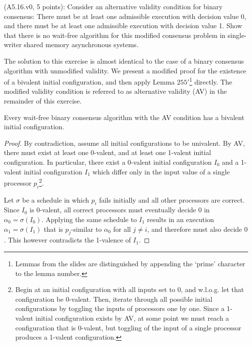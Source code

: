 \begin{Exc}{(A5.16.v0, 5 points):}
Consider an alternative validity condition for binary consensus: There must
be at least one admissible execution with decision value 0, and there
must be at least one admissible execution with decision value 1.
Show that there is no wait-free algorithm for this modified consensus
problem in single-writer shared memory asynchronous systems.
\end{Exc}

The solution to this exercise is almost identical to the case of a binary consensus algorithm
with unmodified validity. We present a modified proof for the existence of a bivalent initial
configuration, and then apply Lemma $255'$\footnote{Lemmas from the slides are
distinguished by appending the `prime' character to the lemma number.} directly. The modified
validity condition is referred to as alternative validity (AV) in the remainder of this exercise.

\begin{lemma}
Every wait-free binary consensus algorithm with the AV condition has a bivalent initial
configuration.
\end{lemma}

\begin{proof}
By contradiction, assume all initial configurations to be univalent. By AV, there must exist
at least one 0-valent, and at least one 1-valent initial configuration. In particular, there exist
a 0-valent initial configuration $I_0$ and a 1-valent initial configuration $I_1$ which differ
only in the input value of a single processor $p_i$\footnote{Begin at an initial configuration with all
inputs set to 0, and w.l.o.g. let that configuration be 0-valent. Then, iterate through all possible
initial configurations by toggling the inputs of processors one by one. Since a 1-valent initial
configuration exists by AV, at some point we must reach a configuration that is 0-valent, but toggling
of the input of a single processor produces a 1-valent configuration.}.

Let $\sigma$ be a schedule in which $p_i$ fails initially and all other processors are correct.
Since $I_0$ is 0-valent, all correct processors must eventually decide $0$ in $\alpha_0 = \sigma(I_0)$.
Applying the same schedule to $I_1$ results in an execution $\alpha_1 = \sigma(I_1)$ that is
$p_j$-similar to $\alpha_0$ for all $j \neq i$, and therefore must also decide $0$. This however
contradicts the 1-valence of $I_1$.
\end{proof}


